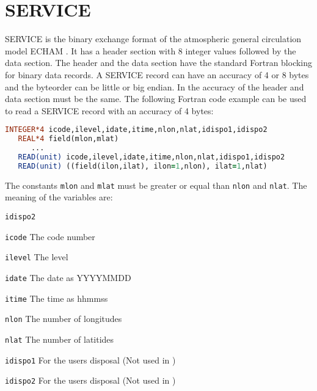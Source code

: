 

\section{SERVICE}

SERVICE is the binary exchange format of the atmospheric general circulation model ECHAM \cite{ECHAM}.
It has a header section with 8 integer values followed by the data section.
The header and the data section have the standard Fortran blocking for binary data records.
A SERVICE record can have an accuracy of 4 or 8 bytes and the byteorder can be little or big endian.
In {\CDI} the accuracy of the header and data section must be the same.
The following Fortran code example can be used to read a SERVICE record with an accuracy of 4 bytes:

\begin{lstlisting}[language=Fortran, backgroundcolor=\color{pyellow}, basicstyle=\small, columns=flexible]
   INTEGER*4 icode,ilevel,idate,itime,nlon,nlat,idispo1,idispo2
   REAL*4 field(mlon,mlat)
      ...
   READ(unit) icode,ilevel,idate,itime,nlon,nlat,idispo1,idispo2
   READ(unit) ((field(ilon,ilat), ilon=1,nlon), ilat=1,nlat)
\end{lstlisting}

The constants {\tt mlon} and {\tt mlat} must be greater or equal than {\tt nlon} and {\tt nlat}.
The meaning of the variables are:

\vspace*{3mm}
\hspace*{8mm}\begin{minipage}{10cm}
\begin{deflist}{{\tt idispo2 \ \ }}
\item[{\tt icode}]    The code number
\item[{\tt ilevel}]   The level
\item[{\tt idate}]    The date as YYYYMMDD
\item[{\tt itime}]    The time as hhmmss
\item[{\tt nlon}]     The number of longitudes
\item[{\tt nlat}]     The number of latitides
\item[{\tt idispo1}]  For the users disposal (Not used in {\CDI})
\item[{\tt idispo2}]  For the users disposal (Not used in {\CDI})
\end{deflist}
\end{minipage}
\vspace*{3mm}

